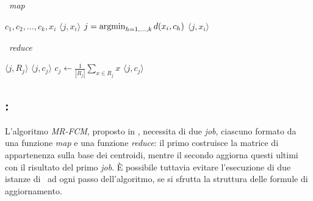 \documentclass[runningheads]{llncs}
\begin{document}
\begin{minipage}[t]{0.48\textwidth}
\begin{algorithm}[H]
\caption{\km\ \textit{map}}
\begin{algorithmic}[1]
    \Require $c_1, c_2, \ldots, c_k, x_i$
    \Ensure $\langle j, x_i \rangle $
    \State $j = \operatorname*{argmin}_{h = 1, \ldots, k} d(x_i, c_h)$
    \State \Return $\langle j, x_i \rangle$
\end{algorithmic}
\end{algorithm}
\end{minipage}%
\hspace{\fill}
\begin{minipage}[t]{0.48\textwidth}
\begin{algorithm}[H]
\caption{\km\ \textit{reduce}}
\begin{algorithmic}[1]
    \Require $\langle j, R_j \rangle$
    \Ensure $\langle j, c_j \rangle$
    \State $c_j \leftarrow \frac{1}{|R_j|}\sum_{x \in R_j} x$
    \State \Return $\langle j, c_j \rangle $
\end{algorithmic}
\end{algorithm}
\end{minipage}


\subsection*{\mr: \fcm}
L'algoritmo \textit{MR-FCM}, proposto in \cite{ludwig2015}, necessita di due \textit{job}, ciascuno formato da una funzione \textit{map} e una funzione \textit{reduce}: il primo costruisce la matrice di appartenenza sulla base dei centroidi, mentre il secondo aggiorna questi ultimi con il risultato del primo \textit{job}. È possibile tuttavia evitare l'esecuzione di due istanze di \mr\ ad ogni passo dell'algoritmo, se si sfrutta la struttura delle formule di aggiornamento.\\
\end{document}
